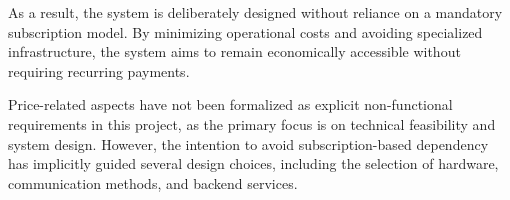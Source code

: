 As a result, the system is deliberately designed without reliance on a mandatory subscription model. By minimizing operational costs and avoiding specialized infrastructure, the system aims to remain economically accessible without requiring recurring payments.

Price-related aspects have not been formalized as explicit non-functional requirements in this project, as the primary focus is on technical feasibility and system design. However, the intention to avoid subscription-based dependency has implicitly guided several design choices, including the selection of hardware, communication methods, and backend services.